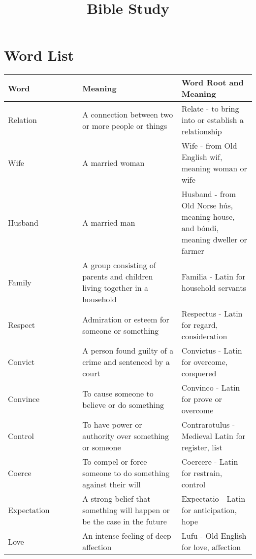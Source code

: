 \documentclass{article}
\title{
Bible Study
}
\begin{document}
\maketitle


\section{Word List}

\begin{table}[h]
\centering
\begin{tabular}{|p{0.3\linewidth}|p{0.4\linewidth}|p{0.3\linewidth}|}
\hline
\textbf{Word} & \textbf{Meaning} & \textbf{Word Root and Meaning} \\
\hline
Relation & A connection between two or more people or things & Relate - to bring into or establish a relationship \\
\hline
Wife & A married woman & Wife - from Old English wif, meaning woman or wife \\
\hline
Husband & A married man & Husband - from Old Norse hús, meaning house, and bóndi, meaning dweller or farmer \\
\hline
Family & A group consisting of parents and children living together in a household & Familia - Latin for household servants \\
\hline
Respect & Admiration or esteem for someone or something & Respectus - Latin for regard, consideration \\
\hline
Convict & A person found guilty of a crime and sentenced by a court & Convictus - Latin for overcome, conquered \\
\hline
Convince & To cause someone to believe or do something & Convinco - Latin for prove or overcome \\
\hline
Control & To have power or authority over something or someone & Contrarotulus - Medieval Latin for register, list \\
\hline
Coerce & To compel or force someone to do something against their will & Coercere - Latin for restrain, control \\
\hline
Expectation & A strong belief that something will happen or be the case in the future & Expectatio - Latin for anticipation, hope \\
\hline
Love & An intense feeling of deep affection & Lufu - Old English for love, affection \\
\hline
\end{tabular}
\end{table}
\end{document}
